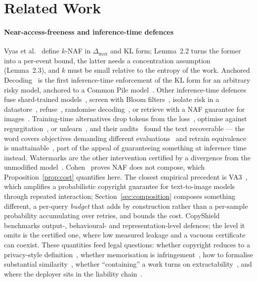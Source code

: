 \section{Related Work}\label{sec:related}

\paragraph{Near-access-freeness and inference-time defences}
Vyas et al.~\cite{vyas2023provable} define $k$-NAF in $\Delta_{\max}$ and KL form; Lemma~2.2 turns the former into a per-event bound, the latter needs a concentration assumption (Lemma~2.3), and $k$ must be small relative to the entropy of the work. Anchored Decoding~\cite{he2026anchored} is the first inference-time enforcement of the KL form for an arbitrary risky model, anchored to a Common Pile model~\cite{kandpal2025commonpile}. Other inference-time defences fuse shard-trained models~\cite{abad2025cpfuse}, screen with Bloom filters~\cite{zhang2025bloomscrub}, isolate risk in a datastore~\cite{min2024silo}, refuse~\cite{liu2024shield}, randomise decoding~\cite{chen2024randomization}, or retrieve with a NAF guarantee for images~\cite{golatkar2024cpr,somepalli2023diffusion}. Training-time alternatives drop tokens from the loss~\cite{hans2024goldfish}, optimise against regurgitation~\cite{chen2025parapo}, or unlearn~\cite{eldan2023whos}, and their audits~\cite{lynch2024eight,shi2025muse,lucki2025adversarial,deeb2024unlearning} found the text recoverable --- the word covers objectives demanding different evaluations~\cite{yoon2026position} and retrain equivalence is unattainable~\cite{yu2025impossibility}, part of the appeal of guaranteeing something at inference time instead. Watermarks are the other intervention certified by a divergence from the unmodified model~\cite{kirchenbauer2023watermark,kuditipudi2024distortionfree,christ2024undetectable}. Cohen~\cite{cohen2025blameless} proves NAF does not compose, which Proposition~\ref{prop:cost} quantifies here. The closest empirical precedent is VA3~\cite{li2024va3}, which amplifies a probabilistic copyright guarantee for text-to-image models through repeated interaction; Section~\ref{sec:composition} composes something different, a per-query \emph{budget} that adds by construction rather than a per-sample probability accumulating over retries, and bounds the cost. CopyShield~\cite{alshehyari2026copyshield} benchmarks output-, behavioural- and representation-level defences; the level it omits is the certified one, where low measured leakage and a vacuous certificate can coexist. These quantities feed legal questions: whether copyright reduces to a privacy-style definition~\cite{elkinkoren2024copyright}, whether memorisation is infringement~\cite{haviv2026separate,cooper2025files}, how to formalise substantial similarity~\cite{scheffler2022formalizing}, whether ``containing'' a work turns on extractability~\cite{lemley2026probabilistic}, and where the deployer sits in the liability chain~\cite{henderson2023fairuse,lee2024talkin}.

